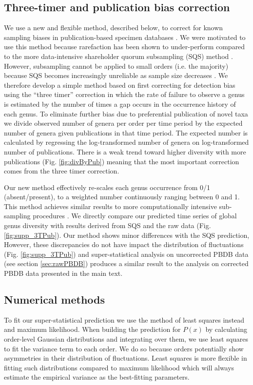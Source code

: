 \documentclass[11pt]{article}
\begin{document}
\subsection{Three-timer and publication bias correction} 
\label{sec:3TP}
We use a new and flexible method, described below, to correct for
known sampling biases in publication-based specimen databases
\citep{alroy08, alroy2010}.  We were motivated to use this method
because rarefaction has been shown to under-perform compared to the
more data-intensive shareholder quorum subsampling (SQS) method
\citep{alroy2010}.  However, subsampling cannot be applied to small
orders (i.e. the majority) because SQS becomes increasingly unreliable
as sample size decreases \citep{alroy2010}.  We therefore develop a
simple method based on first correcting for detection bias using the
``three timer'' correction \citep{alroy08} in which the rate of failure
to observe a genus is estimated by the number of times a gap occurs in
the occurrence history of each genus. To eliminate further bias due to
preferential publication of novel taxa we divide observed number of
genera per order per time period by the expected number of genera
given publications in that time period.  The expected number is
calculated by regressing the log-transformed number of genera on
log-transformed number of publications. There is a weak trend toward
higher diversity with more publications (Fig. \ref{fig:divByPub})
meaning that the most important correction comes from the three timer
correction.

Our new method effectively re-scales each genus occurrence from 0/1
(absent/present), to a weighted number continuously ranging between 0
and 1.  This method achieves similar results to more computationally
intensive sub-sampling procedures \citep{alroy08, alroy2010}. We
directly compare our predicted time series of global genus diversity
with results derived from SQS \citep{alroy2010} and the raw data
(Fig. \ref{fig:supp_3TPub}).  Our method shows minor differences with
the SQS prediction, However, these discrepancies do not have impact
the distribution of fluctuations (Fig. \ref{fig:supp_3TPub}) and
super-statistical analysis on uncorrected PBDB data (see section
\ref{sec:rawPBDB}) produces a similar result to the analysis on
corrected PBDB data presented in the main text.

\subsection{Numerical methods} \label{sec:numMeth} To fit our
super-statistical prediction we use the method of least squares
instead and maximum likelihood. When building the prediction for
$P(x)$ by calculating order-level Gaussian distributions and
integrating over them, we use least squares to fit the variance term
to each order. We do so because orders potentially show asymmetries in
their distribution of fluctuations. Least squares is more flexible in
fitting such distributions compared to maximum likelihood which will
always estimate the empirical variance as the best-fitting parameters.
\end{document}
